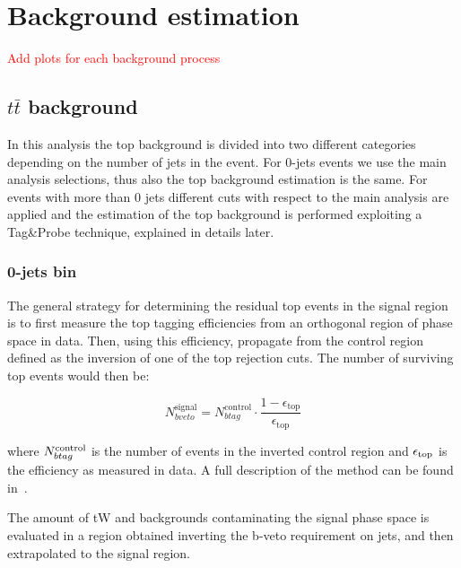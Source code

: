 \section{Background estimation}
\label{sec:Backgrounds}

\textcolor{red}{Add plots for each background process}

\subsection{$t\bar{t}$ background \label{sec:TTBackground}}

In this analysis the top background is divided into two different categories depending on the number of jets in the event. For 0-jets events we use the main analysis selections, thus also the top background estimation is the same. For events with more than 0 jets different cuts with respect to the main analysis are applied and the estimation of the top background is performed exploiting a Tag\&Probe technique, explained in details later.

\subsubsection{0-jets bin}
The general strategy for determining the residual top events in the signal region is to first measure the top tagging efficiencies from an orthogonal region of phase space in data.  Then, using this efficiency, propagate from the control region defined as the inversion of one of the top rejection cuts.
The number of surviving top events would then be:

\begin{equation}
 N^{\mathrm{signal}}_{bveto} = N^{\mathrm{control}}_{btag} \cdot \frac{1-\epsilon_{\mathrm{top}}}{\epsilon_{\mathrm{top}}}
\label{eq:top_equation}
\end{equation}

where $N^{\rm control}_{btag}$ is the number of events in the inverted
control region and $\epsilon_{\rm top}$ is the efficiency as measured
in data. A full description of the method can be found in~\cite{AN-2013-022}. 

The amount of tW and \ttbar backgrounds contaminating the signal phase space is
evaluated in a region obtained inverting the b-veto requirement on jets, and
then extrapolated to the signal region. 

